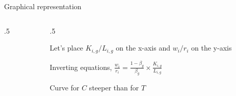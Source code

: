 \documentclass[notes,11pt, aspectratio=169, xcolor=table]{beamer}
\newenvironment{wideitemize}{\itemize\addtolength{\itemsep}{10pt}}{\enditemize}
\begin{document}
\begin{frame}{Graphical representation}
\begin{columns}[T]
\begin{column}{.5\textwidth}
\begin{tikzpicture}
    \end{tikzpicture}

                
    \end{column}
    \begin{column}{.5\textwidth}

    \begin{wideitemize}
        \item Let's place $K_{i,g}/L_{i,g}$ on the x-axis and $w_i/r_i$ on the y-axis

    \item Inverting equations, $\frac{w_i}{r_i} = \frac{1-\beta_g}{\beta_g} \times \frac{K_{i,g}}{L_{i,g}}$

    \item Curve for $C$ steeper than for $T$
    \end{wideitemize}


    \end{column}
\end{columns}
\end{frame}
\end{document}
